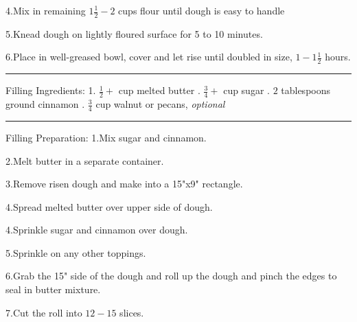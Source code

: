 \documentclass[12pt, letterpaper]{article}
\begin{document}
4.\hspace{0.3cm}Mix in remaining $1\frac{1}{2}-2$ cups flour until dough is easy to handle

5.\hspace{0.3cm}Knead dough on lightly floured surface for 5 to 10 minutes.

6.\hspace{0.3cm}Place in well-greased bowl, cover and let rise until doubled in size, 
\smallbreak
\hspace{0.6cm}$1-1\frac{1}{2}$ hours.

\break 
\begin{center}\noindent\rule{15cm}{0.4pt}\end{center}
\large{Filling Ingredients:}\bigbreak
\normalsize
1.\hspace{0.3cm}  $\frac{1}{2}+$ cup melted butter
.\hspace{0.3cm}  $\frac{3}{4}+$ cup sugar
.\hspace{0.3cm}  $2$ tablespoons ground cinnamon
.\hspace{0.3cm} $\frac{3}{4}$ cup walnut or pecans, \textit{optional}
\smallbreak


\begin{center}\noindent\rule{15cm}{0.4pt}\end{center}
\large{Filling Preparation:}\bigbreak
\normalsize
1.\hspace{0.3cm}Mix sugar and cinnamon.

2.\hspace{0.3cm}Melt butter in a separate container.

3.\hspace{0.3cm}Remove risen dough and make into a 15"x9" rectangle.

4.\hspace{0.3cm}Spread melted butter over upper side of dough.

4.\hspace{0.3cm}Sprinkle sugar and cinnamon over dough.

5.\hspace{0.3cm}Sprinkle on any other toppings.

6.\hspace{0.3cm}Grab the 15" side of the dough and roll up the dough and pinch the 
\smallbreak
\hspace{0.6cm}edges to seal in butter mixture.

7.\hspace{0.3cm}Cut the roll into $12-15$ slices.
\end{document}
